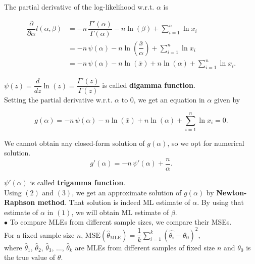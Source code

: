 \documentclass[11pt, a4paper]{article}\usepackage[]{graphicx}\usepackage[]{xcolor}
\begin{document}
The partial derivative of the log-likelihood w.r.t. $\alpha$ is

\begin{align*}
\dfrac{\partial}{\partial \alpha} l(\alpha, \beta) &= -n \, \dfrac{\Gamma'(\alpha)}{\Gamma(\alpha)} - n \ln(\beta) + \sum \limits_{i = 1}^{n} \ln x_i \\
&= -n \, \psi(\alpha) - n \ln \left(\dfrac{\bar{x}}{\alpha}\right) + \sum \limits_{i = 1}^{n} \ln x_i \\
&= -n \, \psi(\alpha) - n \ln(\bar{x}) + n \ln(\alpha) + \sum \limits_{i = 1}^{n} \ln x_i.
\end{align*}

$\psi(z) = \dfrac{d}{dz} \ln(z) = \dfrac{\Gamma'(z)}{\Gamma(z)}$ is called \textbf{digamma function}. \\

Setting the partial derivative w.r.t. $\alpha$ to 0, we get an equation in $\alpha$ given by

\begin{equation}
g(\alpha) = - n \, \psi(\alpha) - n \ln(\bar{x}) + n \ln(\alpha) + \sum \limits_{i = 1}^{n} \ln x_i = 0.
\end{equation}

We cannot obtain any closed-form solution of $g(\alpha)$, so we opt for numerical solution. \\

\begin{equation}
g'(\alpha) = - n \, \psi'(\alpha) + \dfrac{n}{\alpha}.
\end{equation}

$\psi'(\alpha)$ is called \textbf{trigamma function}. \\

Using $(2)$ and $(3)$, we get an approximate solution of $g(\alpha)$ by \textbf{Newton-Raphson method}. That solution is indeed ML estimate of $\alpha$. By using that estimate of $\alpha$ in $(1)$, we will obtain ML estimate of $\beta$. \\

$\bullet$ To compare MLEs from different sample sizes, we compare their MSEs. \\

For a fixed sample size $n$, $\text{MSE}(\hat{\theta}_{\text{MLE}}) = \dfrac{1}{k} \sum \limits_{i = 1}^{k} (\hat{\theta_i} - \theta_0)^2$, \\
where $\hat{\theta}_1$, $\hat{\theta}_2$, $\hat{\theta}_3$, $\ldots$, $\hat{\theta}_k$ are MLEs from different samples of fixed size $n$ and $\theta_0$ is the true value of $\theta$.
\end{document}
